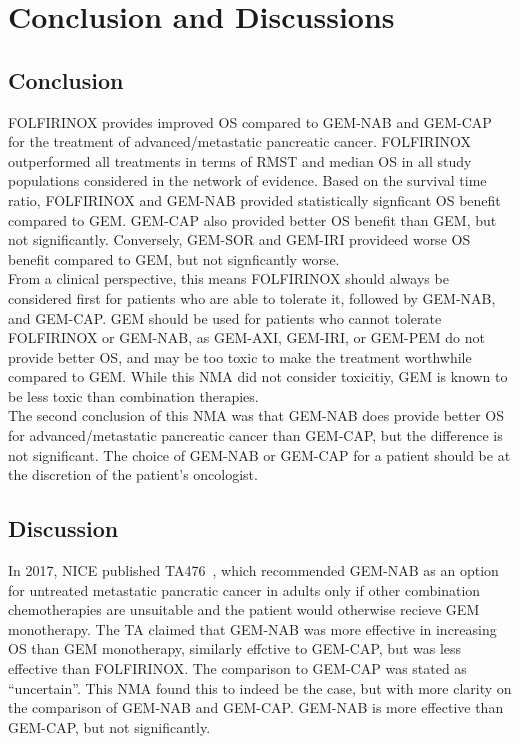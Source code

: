 \chapter{Conclusion and Discussions}\label{conclusions}

\section{Conclusion}
FOLFIRINOX provides improved OS compared to GEM-NAB and GEM-CAP for the treatment of advanced/metastatic pancreatic cancer. FOLFIRINOX outperformed all treatments in terms of RMST and median OS in all study populations considered in the network of evidence. Based on the survival time ratio, FOLFIRINOX and GEM-NAB provided statistically signficant OS benefit compared to GEM. GEM-CAP also provided better OS benefit than GEM, but not significantly. Conversely, GEM-SOR and GEM-IRI provideed worse OS benefit compared to GEM, but not signficantly worse. \\

From a clinical perspective, this means FOLFIRINOX should always be considered first for patients who are able to tolerate it, followed by GEM-NAB, and GEM-CAP. GEM should be used for patients who cannot tolerate FOLFIRINOX or GEM-NAB, as GEM-AXI, GEM-IRI, or GEM-PEM do not provide better OS, and may be too toxic to make the treatment worthwhile compared to GEM. While this NMA did not consider toxicitiy, GEM is known to be less toxic than combination therapies. \\

The second conclusion of this NMA was that GEM-NAB does provide better OS for advanced/metastatic pancreatic cancer than GEM-CAP, but the difference is not significant. The choice of GEM-NAB or GEM-CAP for a patient should be at the discretion of the patient's oncologist.

\section{Discussion}
In 2017, NICE published TA476~\cite{TA476}, which recommended GEM-NAB as an option for untreated metastatic pancratic cancer in adults only if other combination chemotherapies are unsuitable and the patient would otherwise recieve GEM monotherapy. The TA claimed that GEM-NAB was more effective in increasing OS than GEM monotherapy, similarly effctive to GEM-CAP, but was less effective than FOLFIRINOX. The comparison to GEM-CAP was stated as ``uncertain''. This NMA found this to indeed be the case, but with more clarity on the comparison of GEM-NAB and GEM-CAP. GEM-NAB is more effective than GEM-CAP, but not significantly. \\ 

